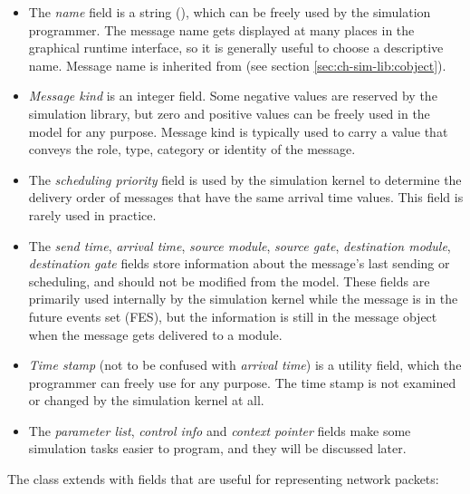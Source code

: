\begin{itemize}
  \item The \textit{name} field is a string (),
    which can be freely used by the simulation programmer. The message
    name gets displayed at many places in the graphical runtime interface,
    so it is generally useful to choose a descriptive name. Message name
    is inherited from  (see section
    \ref{sec:ch-sim-lib:cobject}).
  \item \textit{Message kind} is an integer field.
    Some negative values are reserved by the simulation library, but zero
    and positive values can be freely used in the model for any purpose.
    Message kind is typically used to carry a value that conveys the
    role, type, category or identity of the message.
  \item The \textit{scheduling priority} field is used by the simulation
    kernel to determine the delivery order of messages that have the same
    arrival time values. This field is rarely used in practice.
  \item The \textit{send time}, \textit{arrival time}, \textit{source module},
    \textit{source gate}, \textit{destination module}, \textit{destination gate}
    fields store information about the message's last sending or scheduling,
    and should not be modified from the model. These fields are primarily
    used internally by the simulation kernel while the message is in the
    future events set (FES), but the information is still in
    the message object when the message gets delivered to a module.
  \item \textit{Time stamp} (not to be confused with \textit{arrival time})
    is a utility field, which the programmer can freely use for any purpose.
    The time stamp is not examined or changed by the simulation kernel at all.
  \item The \textit{parameter list}, \textit{control info} and
    \textit{context pointer} fields make some simulation tasks easier
    to program, and they will be discussed later.
\end{itemize}

The  class extends  with fields that are
useful for representing network packets:


